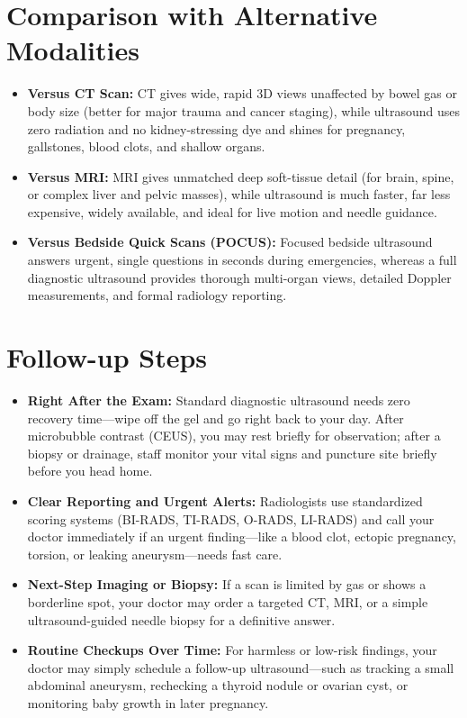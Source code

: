 \section{Comparison with Alternative Modalities}

\begin{itemize}
    \item \textbf{Versus CT Scan:} CT gives wide, rapid 3D views unaffected by bowel gas or body size (better for major trauma and cancer staging), while ultrasound uses zero radiation and no kidney-stressing dye and shines for pregnancy, gallstones, blood clots, and shallow organs.
    \item \textbf{Versus MRI:} MRI gives unmatched deep soft-tissue detail (for brain, spine, or complex liver and pelvic masses), while ultrasound is much faster, far less expensive, widely available, and ideal for live motion and needle guidance.
    \item \textbf{Versus Bedside Quick Scans (POCUS):} Focused bedside ultrasound answers urgent, single questions in seconds during emergencies, whereas a full diagnostic ultrasound provides thorough multi-organ views, detailed Doppler measurements, and formal radiology reporting.
\end{itemize}

\section{Follow-up Steps}

\begin{itemize}
    \item \textbf{Right After the Exam:} Standard diagnostic ultrasound needs zero recovery time---wipe off the gel and go right back to your day. After microbubble contrast (CEUS), you may rest briefly for observation; after a biopsy or drainage, staff monitor your vital signs and puncture site briefly before you head home.
    \item \textbf{Clear Reporting and Urgent Alerts:} Radiologists use standardized scoring systems (BI-RADS, TI-RADS, O-RADS, LI-RADS) and call your doctor immediately if an urgent finding---like a blood clot, ectopic pregnancy, torsion, or leaking aneurysm---needs fast care.
    \item \textbf{Next-Step Imaging or Biopsy:} If a scan is limited by gas or shows a borderline spot, your doctor may order a targeted CT, MRI, or a simple ultrasound-guided needle biopsy for a definitive answer.
    \item \textbf{Routine Checkups Over Time:} For harmless or low-risk findings, your doctor may simply schedule a follow-up ultrasound---such as tracking a small abdominal aneurysm, rechecking a thyroid nodule or ovarian cyst, or monitoring baby growth in later pregnancy.
\end{itemize}

